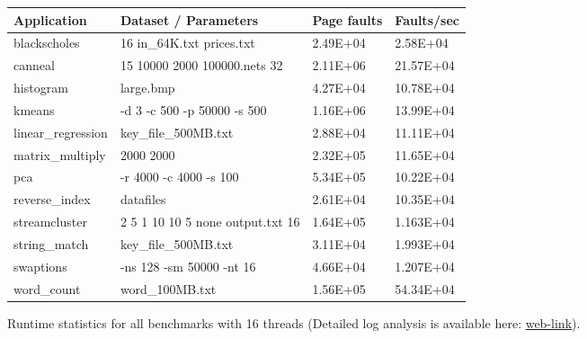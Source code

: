 \begin{figure}[t]
\centering
\myfontsize
{
\begin{tabular}{m{1.6cm}|m{3.2cm}| m{1.2cm}|m{1.3cm}}
   { Application} & Dataset / Parameters & Page faults & Faults/sec\\
  \hline \hline
    blackscholes& 16 in\_64K.txt prices.txt & 2.49E+04& 2.58E+04 \\
    canneal& 15 10000 2000 100000.nets 32 & 2.11E+06 & 21.57E+04 \\
    histogram& large.bmp & 4.27E+04 & 10.78E+04	  \\
    kmeans& -d 3 -c 500 -p 50000 -s 500 & 1.16E+06 & 13.99E+04  \\
    linear\_regression& key\_file\_500MB.txt & 2.88E+04 & 11.11E+04  \\
    matrix\_multiply& 2000 2000 & 2.32E+05 & 11.65E+04  \\
    pca& -r 4000 -c 4000 -s 100 & 5.34E+05 & 10.22E+04\\
    reverse\_index & datafiles & 2.61E+04 & 10.35E+04  \\
    streamcluster& 2 5 1 10 10 5 none output.txt 16 & 1.64E+05 & 1.163E+04\\
    string\_match &key\_file\_500MB.txt & 3.11E+04 & 1.993E+04\\
    swaptions & -ns 128 -sm 50000 -nt 16  & 4.66E+04 & 1.207E+04 \\
    word\_count& word\_100MB.txt	 & 1.56E+05 & 54.34E+04  \\

\hline
\end{tabular}
}


\caption{\label{tab:apps} Runtime statistics for all benchmarks with 16 threads (Detailed log analysis is available here: \href{https://mic92.github.io/inspector/index.html\#measurement_table}{web-link}). }                                                                                                                                  


\end{figure}
